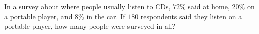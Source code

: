 In a survey about where people usually listen to CDs, $72\%$ said at home, $20\%$ on a portable player, and $8\%$ in the car. If $180$ respondents said they listen on a portable player, how many people were surveyed in all?
